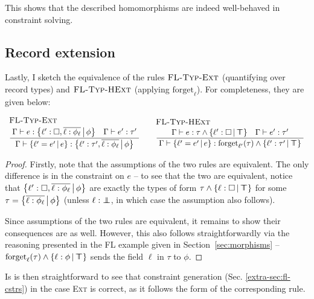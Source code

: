 This shows that the described homomorphisms are indeed well-behaved in constraint solving.

\needspace{6em}
\subsection{Record extension}

Lastly, I sketch the equivalence of the rules $\textsc{FL-Typ-Ext}$ (quantifying over record types) and $\textsc{FL-Typ-HExt}$ (applying $\mathrm{forget}_\ell$). For completeness, they are given below:
$$
\irule{FL-Typ-Ext}
    {\Gamma \vdash e : \flext{\ell' : \flabsent, \overline{\ell : \phi_\ell}}{\phi} \quad \Gamma \vdash e' : \tau'}
    {\Gamma \vdash \flext{\ell' = e'}{e} : \flext{\ell' : \tau', \overline{\ell : \phi_\ell}}{\phi}}
\quad 
\irule{FL-Typ-HExt}{\Gamma \vdash e : \tau \meet \flext{\ell' : \flabsent}{\flftop} \quad \Gamma \vdash e' : \tau'}{\Gamma \vdash \flext{\ell' = e'}{e} : \mathrm{forget}_{\ell'}(\tau) \meet \flext{\ell' : \tau'}{\flftop}}
$$
\begin{proof}
    Firstly, note that the assumptions of the two rules are equivalent. The only difference is in the constraint on $e$ -- to see that the two are equivalent, notice that $\flext{\ell' : \flabsent, \overline{\ell : \phi_\ell}}{\phi}$ are exactly the types of form $\tau \meet \flext{\ell : \flabsent}{\flftop}$ for some $\tau = \flext{\overline{\ell : \phi_\ell}}{\phi}$ (unless $\ell : \bot \!\!\!\! \bot$, in which case the assumption also follows).

    Since assumptions of the two rules are equivalent, it remains to show their consequences are as well. However, this also follows straightforwardly via the reasoning presented in the FL example given in Section~\ref{sec:morphisms} -- $\mathrm{forget}_\ell(\tau) \meet \flext{\ell : \phi}{\flftop}$ sends the field $\ell$ in $\tau$ to $\phi$. 
\end{proof}

Is is then straightforward to see that constraint generation (Sec. \ref{extra-sec:fl-cstrs}) in the case \textsc{Ext} is correct, as it follows the form of the corresponding rule.